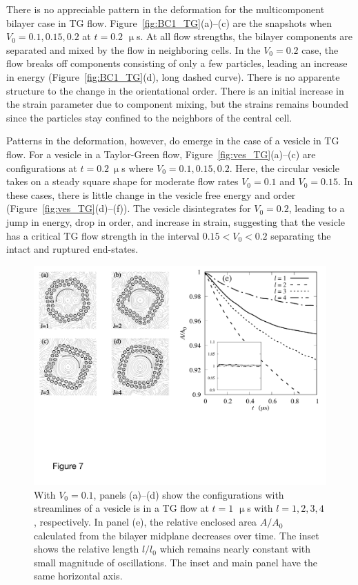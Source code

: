 \documentclass[prb,preprint,showpacs,preprintnumbers,amsmath,amssymb,longbibliography]{revtex4-1}
\begin{document}
There is no appreciable pattern in the deformation for the
multicomponent bilayer case in TG flow. Figure~\ref{fig:BC1_TG}(a)--(c)
are the snapshots when $V_0=0.1,0.15,0.2$ at $t = 0.2$ $\upmu$s. At all
flow strengths, the bilayer components are separated and mixed by the
flow in neighboring cells. In the $V_0 = 0.2$ case, the flow breaks off
components consisting of only a few particles, leading an increase in
energy (Figure~\ref{fig:BC1_TG}(d), long dashed curve). There is no
apparente structure to the change in the orientational order. There is an initial
increase in the strain parameter due to component mixing, but the
strains remains bounded since the particles stay confined to the
neighbors of the central cell.


Patterns in the deformation, however, do emerge in the case of a vesicle
in TG flow. For a vesicle in a Taylor-Green flow,
Figure~\ref{fig:ves_TG}(a)--(c) are configurations at $t=0.2\ \upmu$s
where $V_0=0.1,0.15,0.2$. Here, the circular vesicle takes on a steady
square shape for moderate flow rates $V_0 = 0.1$ and $V_0 = 0.15$. In
these cases, there is little change in the vesicle free energy and order
(Figure~\ref{fig:ves_TG}(d)--(f)). The vesicle disintegrates for $V_0 =
0.2$, leading to a jump in energy, drop in order, and increase in
strain, suggesting that the vesicle has a critical TG flow strength in
the interval $0.15 < V_0 <  0.2$ separating the intact and ruptured
end-states.

\begin{figure}
  \begin{center}
\includegraphics[width=1.0\textwidth]{Figures/Figure7.pdf}
  \end{center}
  \vspace{-20pt}  
  \caption{\label{fig:BTG_Scale} With $V_0=0.1$, panels (a)--(d) show
  the configurations with streamlines of a vesicle is in a TG flow at
  $t=1$ $\upmu$s with $l= 1,2,3,4$, respectively. In panel (e), the
  relative enclosed area $A/A_0$ calculated from the bilayer midplane
  decreases over time. The inset shows the relative length $l/l_0$ which
  remains nearly constant with small magnitude of oscillations. The
  inset and main panel have the same horizontal axis.}
\end{figure}
\end{document}

